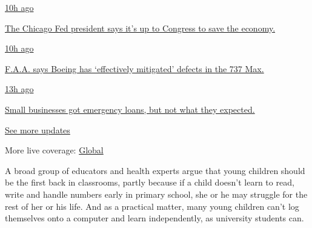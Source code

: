 \href{https://www.nytimes.com/live/2020/08/03/business/stock-market-today-coronavirus?action=click\&pgtype=Article\&state=default\&region=MAIN_CONTENT_1\&context=storylines_live_updates\#the-chicago-fed-president-says-its-up-to-congress-to-save-the-economy}{10h
ago}

\href{https://www.nytimes.com/live/2020/08/03/business/stock-market-today-coronavirus?action=click\&pgtype=Article\&state=default\&region=MAIN_CONTENT_1\&context=storylines_live_updates\#the-chicago-fed-president-says-its-up-to-congress-to-save-the-economy}{The
Chicago Fed president says it's up to Congress to save the economy.}

\href{https://www.nytimes.com/live/2020/08/03/business/stock-market-today-coronavirus?action=click\&pgtype=Article\&state=default\&region=MAIN_CONTENT_1\&context=storylines_live_updates\#faa-says-boeing-has-effectively-mitigated-defects-in-the-737-max}{10h
ago}

\href{https://www.nytimes.com/live/2020/08/03/business/stock-market-today-coronavirus?action=click\&pgtype=Article\&state=default\&region=MAIN_CONTENT_1\&context=storylines_live_updates\#faa-says-boeing-has-effectively-mitigated-defects-in-the-737-max}{F.A.A.
says Boeing has `effectively mitigated' defects in the 737 Max.}

\href{https://www.nytimes.com/live/2020/08/03/business/stock-market-today-coronavirus?action=click\&pgtype=Article\&state=default\&region=MAIN_CONTENT_1\&context=storylines_live_updates\#small-businesses-got-emergency-loans-but-not-what-they-expected}{13h
ago}

\href{https://www.nytimes.com/live/2020/08/03/business/stock-market-today-coronavirus?action=click\&pgtype=Article\&state=default\&region=MAIN_CONTENT_1\&context=storylines_live_updates\#small-businesses-got-emergency-loans-but-not-what-they-expected}{Small
businesses got emergency loans, but not what they expected.}

\href{https://www.nytimes.com/live/2020/08/03/business/stock-market-today-coronavirus?action=click\&pgtype=Article\&state=default\&region=MAIN_CONTENT_1\&context=storylines_live_updates}{See
more updates}

More live coverage:
\href{https://www.nytimes.com/2020/08/03/world/coronavirus-covid-19.html?action=click\&pgtype=Article\&state=default\&region=MAIN_CONTENT_1\&context=storylines_live_updates}{Global}

A broad group of educators and health experts argue that young children
should be the first back in classrooms, partly because if a child
doesn't learn to read, write and handle numbers early in primary school,
she or he may struggle for the rest of her or his life. And as a
practical matter, many young children can't log themselves onto a
computer and learn independently, as university students can.

